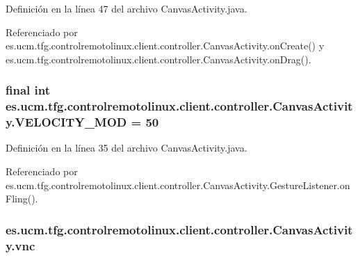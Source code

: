 Definición en la línea 47 del archivo Canvas\-Activity.\-java.



Referenciado por es.\-ucm.\-tfg.\-controlremotolinux.\-client.\-controller.\-Canvas\-Activity.\-on\-Create() y es.\-ucm.\-tfg.\-controlremotolinux.\-client.\-controller.\-Canvas\-Activity.\-on\-Drag().

\hypertarget{classes_1_1ucm_1_1tfg_1_1controlremotolinux_1_1client_1_1controller_1_1CanvasActivity_a646d0e209d35564cdc42d837671bd7a4}{
\subsubsection[{V\-E\-L\-O\-C\-I\-T\-Y\-\_\-\-M\-O\-D}]{\setlength{\rightskip}{0pt plus 5cm}final int es.\-ucm.\-tfg.\-controlremotolinux.\-client.\-controller.\-Canvas\-Activity.\-V\-E\-L\-O\-C\-I\-T\-Y\-\_\-\-M\-O\-D = 50\hspace{0.3cm}{\ttfamily [static]}}}\label{classes_1_1ucm_1_1tfg_1_1controlremotolinux_1_1client_1_1controller_1_1CanvasActivity_a646d0e209d35564cdc42d837671bd7a4}


Definición en la línea 35 del archivo Canvas\-Activity.\-java.



Referenciado por es.\-ucm.\-tfg.\-controlremotolinux.\-client.\-controller.\-Canvas\-Activity.\-Gesture\-Listener.\-on\-Fling().

\hypertarget{classes_1_1ucm_1_1tfg_1_1controlremotolinux_1_1client_1_1controller_1_1CanvasActivity_a7508b6459e8ff8e166d2e6494a6eb356}{
\subsubsection[{vnc}]{ es.\-ucm.\-tfg.\-controlremotolinux.\-client.\-controller.\-Canvas\-Activity.\-vnc\hspace{0.3cm}{\ttfamily [private]}}}\label{classes_1_1ucm_1_1tfg_1_1controlremotolinux_1_1client_1_1controller_1_1CanvasActivity_a7508b6459e8ff8e166d2e6494a6eb356}


